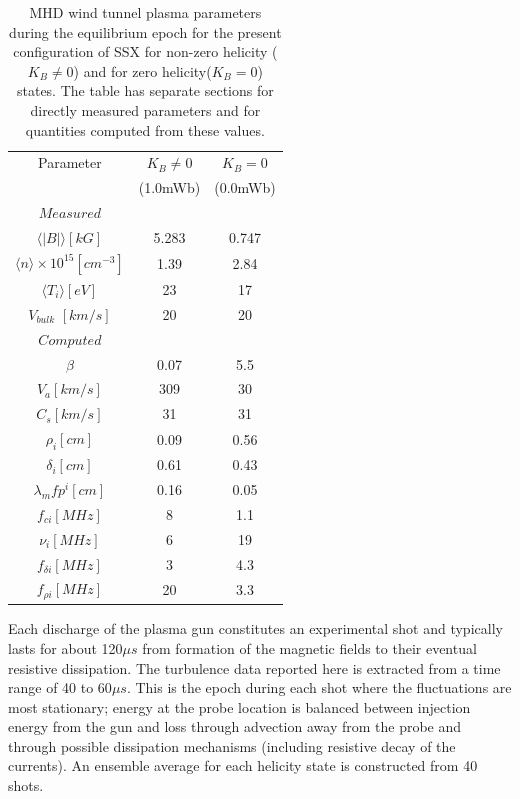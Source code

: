 \documentclass[aps,prl,amsmath,amssymb,reprint,superscriptaddress]{revtex4-1} %
\begin{document}




\begin{table}
\caption{\label{tab:params}MHD wind tunnel plasma parameters during the equilibrium epoch for the present configuration of SSX for non-zero helicity ($K_{B}\neq 0$) and for zero helicity($K_{B}=0$) states. The table has separate sections for directly measured parameters and for quantities computed from these values.}
\begin{tabular}{c|cc}
\toprule
Parameter&$K_{B}\neq 0$&$K_{B}=0$\\
				 &(1.0mWb)             &(0.0mWb)\\
\hline
$Measured$&&\\
\hline
$\langle |B|\rangle [kG]$&5.283&0.747\\
$\langle n\rangle \times 10^{15} [cm^{-3}]$&1.39&2.84\\
$\langle T_{i}\rangle [eV]$&23&17\\
$V_{bulk}$ $[km/s]$&20&20\\
\hline
$Computed$&&\\
\hline
$\beta$&0.07&5.5\\
$V_{a} [km/s]$&309&30\\
$C_{s} [km/s]$&31&31\\
$\rho_{i} [cm]$&0.09&0.56\\
$\delta_{i} [cm]$&0.61&0.43\\
$\lambda_mfp^{i} [cm]$&0.16&0.05\\
$f_{ci} [MHz]$&8&1.1\\
$\nu_{i} [MHz]$&6&19\\
$f_{\delta i} [MHz]$&3&4.3\\
$f_{\rho i} [MHz]$&20&3.3\\
\hline
\end{tabular}
\end{table}

Each discharge of the plasma gun constitutes an experimental shot and typically lasts for about 120$\mu s$ from formation of the magnetic fields to their eventual resistive dissipation. The turbulence data reported here is extracted from a time range of 40 to 60$\mu s$. This is the epoch during each shot where the fluctuations are most stationary; energy at the probe location is balanced between injection energy from the gun and loss through advection away from the probe and through possible dissipation mechanisms (including resistive decay of the currents). An ensemble average for each helicity state is constructed from 40 shots.
\end{document}
